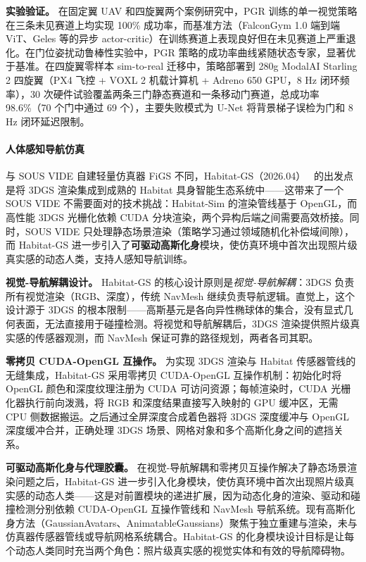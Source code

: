 \textbf{实验验证。}
在固定翼 UAV 和四旋翼两个案例研究中，PGR 训练的单一视觉策略在三条未见赛道上均实现 100\% 成功率，而基准方法（FalconGym 1.0 端到端 ViT、Geles 等的异步 actor-critic）在训练赛道上表现良好但在未见赛道上严重退化。在门位姿扰动鲁棒性实验中，PGR 策略的成功率曲线紧随状态专家，显著优于基准。在四旋翼零样本 sim-to-real 迁移中，策略部署到 280g ModalAI Starling 2 四旋翼（PX4 飞控 + VOXL 2 机载计算机 + Adreno 650 GPU，8 Hz 闭环频率），30 次硬件试验覆盖两条三门静态赛道和一条移动门赛道，总成功率 98.6\%（70 个门中通过 69 个），主要失败模式为 U-Net 将背景梯子误检为门和 8 Hz 闭环延迟限制。

\paragraph{人体感知导航仿真}

与 SOUS VIDE 自建轻量仿真器 FiGS 不同，Habitat-GS（2026.04）~\cite{2604_12626} 的出发点是将 3DGS 渲染集成到成熟的 Habitat 具身智能生态系统中——这带来了一个 SOUS VIDE 不需要面对的技术挑战：Habitat-Sim 的渲染管线基于 OpenGL，而高性能 3DGS 光栅化依赖 CUDA 分块渲染，两个异构后端之间需要高效桥接。同时，SOUS VIDE 只处理静态场景渲染（策略学习通过领域随机化补偿域间隙），而 Habitat-GS 进一步引入了\textbf{可驱动高斯化身}模块，使仿真环境中首次出现照片级真实感的动态人类，支持人感知导航训练。

\textbf{视觉-导航解耦设计。}
Habitat-GS 的核心设计原则是\emph{视觉-导航解耦}：3DGS 负责所有视觉渲染（RGB、深度），传统 NavMesh 继续负责导航逻辑。直觉上，这个设计源于 3DGS 的根本限制——高斯基元是各向异性椭球体的集合，没有显式几何表面，无法直接用于碰撞检测。将视觉和导航解耦后，3DGS 渲染提供照片级真实感的传感器观测，而 NavMesh 保证可靠的路径规划，两者各司其职。

\textbf{零拷贝 CUDA-OpenGL 互操作。}
为实现 3DGS 渲染与 Habitat 传感器管线的无缝集成，Habitat-GS 采用零拷贝 CUDA-OpenGL 互操作机制：初始化时将 OpenGL 颜色和深度纹理注册为 CUDA 可访问资源；每帧渲染时，CUDA 光栅化器执行前向泼溅，将 RGB 和深度结果直接写入映射的 GPU 缓冲区，无需 CPU 侧数据搬运。之后通过全屏深度合成着色器将 3DGS 深度缓冲与 OpenGL 深度缓冲合并，正确处理 3DGS 场景、网格对象和多个高斯化身之间的遮挡关系。

\textbf{可驱动高斯化身与代理胶囊。}
在视觉-导航解耦和零拷贝互操作解决了静态场景渲染问题之后，Habitat-GS 进一步引入化身模块，使仿真环境中首次出现照片级真实感的动态人类——这是对前置模块的递进扩展，因为动态化身的渲染、驱动和碰撞检测分别依赖 CUDA-OpenGL 互操作管线和 NavMesh 导航系统。现有高斯化身方法（GaussianAvatars、AnimatableGaussians）聚焦于独立重建与渲染，未与仿真器传感器管线或导航网格系统耦合。Habitat-GS 的化身模块设计目标是让每个动态人类同时充当两个角色：照片级真实感的视觉实体和有效的导航障碍物。

